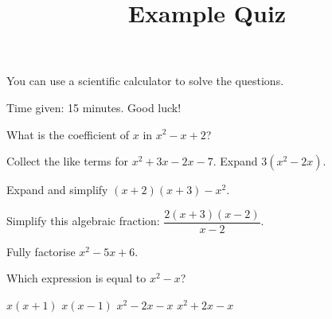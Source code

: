 \documentclass{source/quiz}
\title{Example Quiz}
\begin{document}
\maketitle

You can use a scientific calculator to solve the questions.

Time given: 15 minutes.
Good luck!

\begin{questions}

\question What is the coefficient of $x$ in $x^2 - x + 2$?

\question[2] Collect the like terms for $x^2 + 3x - 2x - 7$.
\question[2] Expand $3(x^2-2x)$. \droppoints

\question[4] Expand and simplify $(x+2)(x+3)-x^2$. \droppoints
\vspace{2cm}

\question[4] Simplify this algebraic fraction: $\dfrac{2(x+3)(x-2)}{x-2}$. \droppoints
{}

\question[4] Fully factorise $x^2 - 5x + 6$. \droppoints
{}

\newpage

\question[1] Which expression is equal to $x^2 - x$?
\begin{choices}
    \choice $x(x+1)$
    \choice $x(x-1)$
    \choice $x^2 - 2x - x$
    \choice $x^2 + 2x - x$
\end{choices}
\vspace{1cm}


\end{questions}
\end{document}

